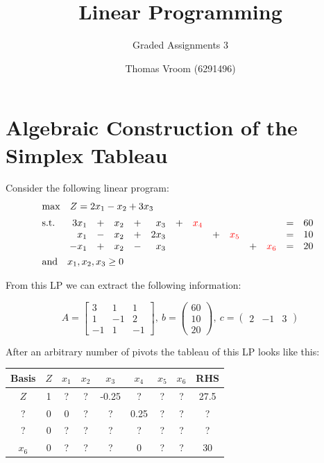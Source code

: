 \documentclass[12pt]{article}
\title{Linear Programming}
\subtitle{Graded Assignments 3}
\author{Thomas Vroom (6291496)}
\begin{document}
\maketitle

%
%
\section{Algebraic Construction of the Simplex Tableau}
Consider the following linear program:
\begin{align*}
  &\mathrm{max} \quad Z = 2x_1 - x_2 + 3x_3 \\[2pt]
  &\mathrm{s.t.} \quad 
  \begin{array}[t]{r c r c r c r c r c r c r c}
      3x_1 & + & x_2 & + & x_3 & + & \textcolor{red}{x_4} & & & & & = & 60 \\
      x_1 & - & x_2 & + & 2x_3 & & & + & \textcolor{red}{x_5} & & & = & 10 \\
      -x_1 & + & x_2 & - & x_3 & & & & & + & \textcolor{red}{x_6} & = & 20
  \end{array}\\
  &\mathrm{and} \quad x_1, x_2, x_3 \geq 0
\end{align*}

\noindent
From this LP we can extract the following information:

\begin{equation*}
  A = \begin{bmatrix}
     3 &  1 &  1 \\
     1 & -1 &  2 \\
    -1 &  1 & -1
  \end{bmatrix},\ 
  b = \begin{pmatrix}
    60 \\
    10 \\
    20
  \end{pmatrix},\ 
  c = \begin{pmatrix}
    2 & -1 & 3
  \end{pmatrix}
\end{equation*}

\noindent
After an arbitrary number of pivots the tableau of this LP looks like this:

\begin{table}[h]
  \centering
  \begin{tabular}{c|c|ccc|ccc|c}
  Basis & $Z$ & $x_1$ & $x_2$ & $x_3$ & $x_4$ & $x_5$ & $x_6$ & RHS \\ \hline
  $Z$ & 1 & ? & ? & -0.25 & ? & ? & ? & 27.5 \\ \hline
  ? & 0 & 0 & ? & ? & 0.25 & ? & ? & ? \\
  ? & 0 & ? & ? & ? & ? & ? & ? & ? \\
  $x_6$ & 0 & ? & ? & ? & 0 & ? & ? & 30
  \end{tabular}
\end{table}
\end{document}
